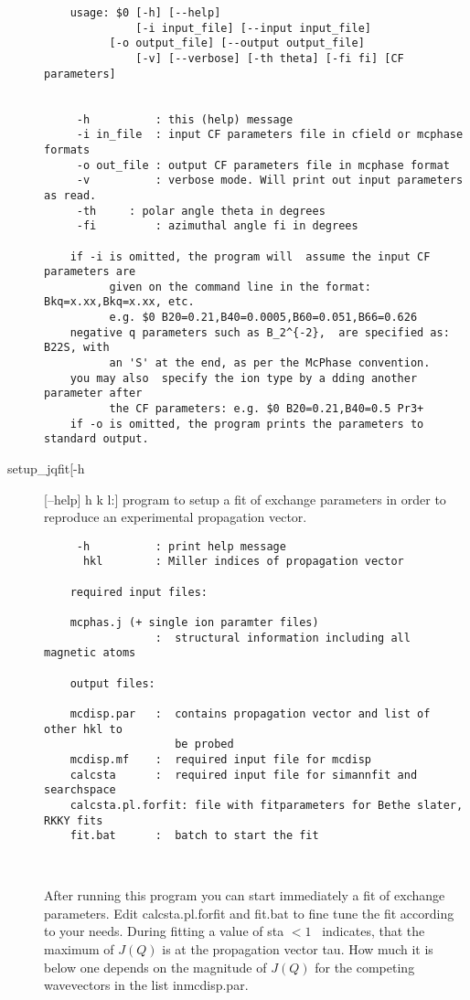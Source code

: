 \begin{description}
\begin{verbatim}
    usage: $0 [-h] [--help] 
              [-i input_file] [--input input_file]
	      [-o output_file] [--output output_file]
              [-v] [--verbose] [-th theta] [-fi fi] [CF parameters]

          
     -h          : this (help) message
     -i in_file  : input CF parameters file in cfield or mcphase formats
     -o out_file : output CF parameters file in mcphase format
     -v          : verbose mode. Will print out input parameters as read.
     -th	 : polar angle theta in degrees
     -fi         : azimuthal angle fi in degrees

    if -i is omitted, the program will  assume the input CF parameters are
          given on the command line in the format: Bkq=x.xx,Bkq=x.xx, etc.
          e.g. $0 B20=0.21,B40=0.0005,B60=0.051,B66=0.626
    negative q parameters such as B_2^{-2},  are specified as:  B22S, with 
          an 'S' at the end, as per the McPhase convention.
    you may also  specify the ion type by a dding another  parameter after
          the CF parameters: e.g. $0 B20=0.21,B40=0.5 Pr3+
    if -o is omitted, the program prints the parameters to standard output.
  \end{verbatim}
\item[\prg   setup\_jqfit\index{setup\_jqfit}[-h] [--help] h k l:] program to setup a fit of exchange parameters in order to reproduce an experimental propagation vector.
\begin{verbatim}
     -h          : print help message
      hkl        : Miller indices of propagation vector

    required input files:

    mcphas.j (+ single ion paramter files)
                 :  structural information including all magnetic atoms

    output files:

    mcdisp.par   :  contains propagation vector and list of other hkl to
                    be probed
    mcdisp.mf    :  required input file for mcdisp
    calcsta      :  required input file for simannfit and searchspace
    calcsta.pl.forfit: file with fitparameters for Bethe slater, RKKY fits
    fit.bat      :  batch to start the fit

   
\end{verbatim}

 After running this program you can start immediately a fit of exchange
    parameters. Edit {\prg calcsta.pl.forfit} and {\prg fit.bat} to fine tune the fit 
    according to your needs.
    During fitting a value of sta $< 1$~ indicates, that the maximum of $J(Q)$ is
    at the propagation vector tau. How much it is below one depends on the
    magnitude of $J(Q)$ for the competing wavevectors in the list in{\prg  mcdisp.par}.


\end{description}
